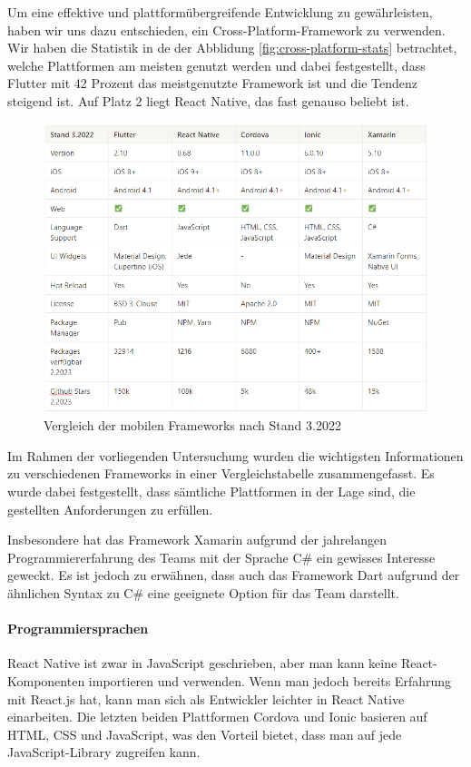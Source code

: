 Um eine effektive und plattformübergreifende Entwicklung zu gewährleisten, haben wir uns dazu entschieden, ein Cross-Platform-Framework zu verwenden. Wir haben die Statistik in de der Abblidung \ref{fig:cross-platform-stats} betrachtet, welche Plattformen am meisten genutzt werden und dabei festgestellt, dass Flutter mit 42 Prozent das meistgenutzte Framework ist und die Tendenz steigend ist. Auf Platz 2 liegt React Native, das fast genauso beliebt ist.

\begin{figure}[h]
    \centering
    \includegraphics[width=1\textwidth]{pics/framework-comp.png}
    \caption{Vergleich der mobilen Frameworks nach Stand 3.2022 \cite{flutter, react-native, cordova, ionic, xamarin}}
    \label{fig:framework-comp}
\end{figure}

Im Rahmen der vorliegenden Untersuchung wurden die wichtigsten Informationen zu verschiedenen Frameworks in einer Vergleichstabelle zusammengefasst. Es wurde dabei festgestellt, dass sämtliche Plattformen in der Lage sind, die gestellten Anforderungen zu erfüllen. 

Insbesondere hat das Framework Xamarin aufgrund der jahrelangen Programmiererfahrung des Teams mit der Sprache C\# ein gewisses Interesse geweckt. Es ist jedoch zu erwähnen, dass auch das Framework Dart aufgrund der ähnlichen Syntax zu C\# eine geeignete Option für das Team darstellt.

\paragraph{Programmiersprachen}
React Native ist zwar in JavaScript geschrieben, aber man kann keine React-Komponenten importieren und verwenden. Wenn man jedoch bereits Erfahrung mit React.js hat, kann man sich als Entwickler leichter in React Native einarbeiten. Die letzten beiden Plattformen Cordova und Ionic basieren auf HTML, CSS und JavaScript, was den Vorteil bietet, dass man auf jede JavaScript-Library zugreifen kann.


